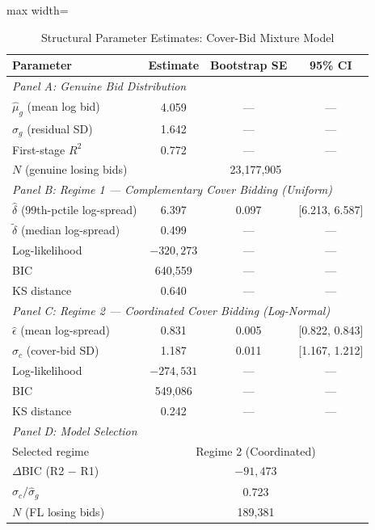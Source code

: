 
\begin{table}[htbp]
\centering
\caption{Structural Parameter Estimates: Cover-Bid Mixture Model}
\label{tab:structural_params}
\begin{adjustbox}{max width=\textwidth}
\begin{threeparttable}
\footnotesize
\begin{tabular}{lccc}
\toprule
Parameter & Estimate & Bootstrap SE & 95\% CI \\
\midrule
\multicolumn{4}{l}{\textit{Panel A: Genuine Bid Distribution}} \\[1pt]
$\hat{\mu}_g$ (mean log bid) & 4.059 & --- & --- \\
$\hat{\sigma}_g$ (residual SD) & 1.642 & --- & --- \\
First-stage $R^2$ & 0.772 & --- & --- \\
$N$ (genuine losing bids) & \multicolumn{3}{c}{23,177,905} \\
\midrule
\multicolumn{4}{l}{\textit{Panel B: Regime 1 --- Complementary Cover Bidding (Uniform)}} \\[1pt]
$\hat{\delta}$ (99th-pctile log-spread) & 6.397 & 0.097 & [6.213, 6.587] \\
$\tilde{\delta}$ (median log-spread) & 0.499 & --- & --- \\
Log-likelihood & $-320,273$ & --- & --- \\
BIC & 640,559 & --- & --- \\
KS distance & 0.640 & --- & --- \\
\midrule
\multicolumn{4}{l}{\textit{Panel C: Regime 2 --- Coordinated Cover Bidding (Log-Normal)}} \\[1pt]
$\hat{\epsilon}$ (mean log-spread) & 0.831 & 0.005 & [0.822, 0.843] \\
$\hat{\sigma}_c$ (cover-bid SD) & 1.187 & 0.011 & [1.167, 1.212] \\
Log-likelihood & $-274,531$ & --- & --- \\
BIC & 549,086 & --- & --- \\
KS distance & 0.242 & --- & --- \\
\midrule
\multicolumn{4}{l}{\textit{Panel D: Model Selection}} \\[1pt]
Selected regime & \multicolumn{3}{c}{Regime 2 (Coordinated)} \\
$\Delta$BIC (R2 $-$ R1) & \multicolumn{3}{c}{$-91,473$} \\
$\hat{\sigma}_c / \hat{\sigma}_g$ & \multicolumn{3}{c}{0.723} \\
$N$ (FL losing bids) & \multicolumn{3}{c}{189,381} \\

\end{tabular}
\end{threeparttable}
\end{adjustbox}
\end{table}
